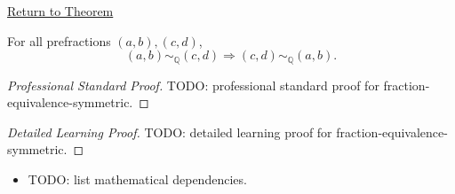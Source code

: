 \newpage
{}
\label{prf:fraction-equivalence-symmetric}

\begin{remark*}[Return]
\hyperref[lem:fraction-equivalence-symmetric]{Return to Theorem}
\end{remark*}

\begin{lemma*}
For all prefractions $(a,b),(c,d)$,
\[
(a,b)\sim_{\mathbb{Q}}(c,d)
\Longrightarrow
(c,d)\sim_{\mathbb{Q}}(a,b).
\]
\end{lemma*}

\begin{proof}[Professional Standard Proof]
\LRAProofBodyStart
TODO: professional standard proof for fraction-equivalence-symmetric.
\end{proof}

\begin{proof}[Detailed Learning Proof]
\LRAProofBodyStart
TODO: detailed learning proof for fraction-equivalence-symmetric.
\end{proof}

\begin{remark*}
\end{remark*}

\begin{dependencies}
\begin{itemize}
  \item TODO: list mathematical dependencies.
\end{itemize}
\end{dependencies}

\clearpage
